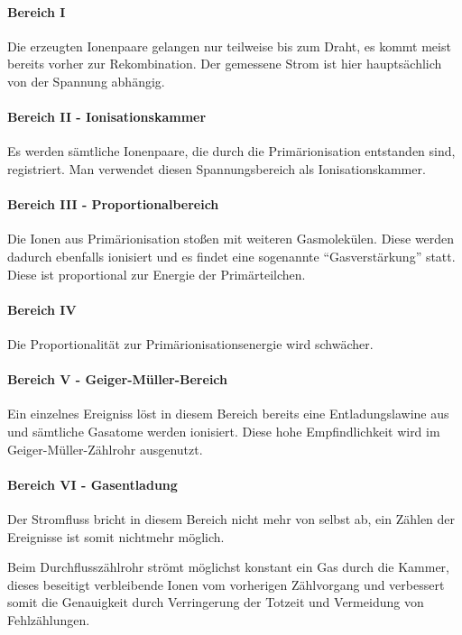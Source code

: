 \paragraph{Bereich I} Die erzeugten Ionenpaare gelangen nur teilweise bis zum Draht, es kommt meist bereits vorher zur Rekombination. Der gemessene Strom ist hier hauptsächlich von der Spannung abhängig.
\paragraph{Bereich II - Ionisationskammer} Es werden sämtliche Ionenpaare, die durch die Primärionisation entstanden sind, registriert. Man verwendet diesen Spannungsbereich als Ionisationskammer.
\paragraph{Bereich III - Proportionalbereich} Die Ionen aus Primärionisation stoßen mit weiteren Gasmolekülen. Diese werden dadurch ebenfalls ionisiert und es findet eine sogenannte "`Gasverstärkung"' statt. Diese ist proportional zur Energie der Primärteilchen.
\paragraph{Bereich IV} Die Proportionalität zur Primärionisationsenergie wird schwächer.
\paragraph{Bereich V - Geiger-Müller-Bereich} Ein einzelnes Ereigniss löst in diesem Bereich bereits eine Entladungslawine aus und sämtliche Gasatome werden ionisiert. Diese hohe Empfindlichkeit wird im Geiger-Müller-Zählrohr ausgenutzt. 
\paragraph{Bereich VI - Gasentladung} Der Stromfluss bricht in diesem Bereich nicht mehr von selbst ab, ein Zählen der Ereignisse ist somit nichtmehr möglich.

Beim Durchflusszählrohr strömt möglichst konstant ein Gas durch die Kammer, dieses beseitigt verbleibende Ionen vom vorherigen Zählvorgang und verbessert somit die Genauigkeit durch Verringerung der Totzeit und Vermeidung von Fehlzählungen.


























